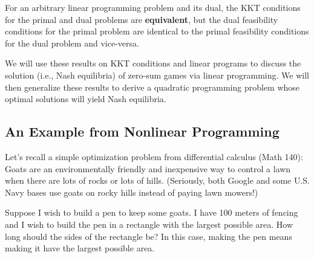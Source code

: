\begin{remark} For an arbitrary linear programming problem and its dual, the KKT conditions for the primal and dual problems are \textbf{equivalent}, but the dual feasibility conditions for the primal problem are identical to the primal feasibility conditions for the dual problem and vice-versa. 
\end{remark}

\begin{remark} We will use these results on KKT conditions and linear programs to discuss the solution (i.e., Nash equilibria) of zero-sum games via linear programming. We will then generalize these results to derive a quadratic programming problem whose optimal solutions will yield Nash equilibria. 
\end{remark}

\subsection{An Example from Nonlinear Programming}
Let's recall a simple optimization problem from differential calculus (Math 140): Goats are an environmentally friendly and inexpensive way to control a lawn when there are lots of rocks or lots of hills. (Seriously, both Google and some U.S. Navy bases use goats on rocky hills instead of paying lawn mowers!) 

Suppose I wish to build a pen to keep some goats. I have 100 meters of fencing and I wish to build the pen in a rectangle with the largest possible area. How long should the sides of the rectangle be? In this case, making the pen  means making it have the largest possible area.


